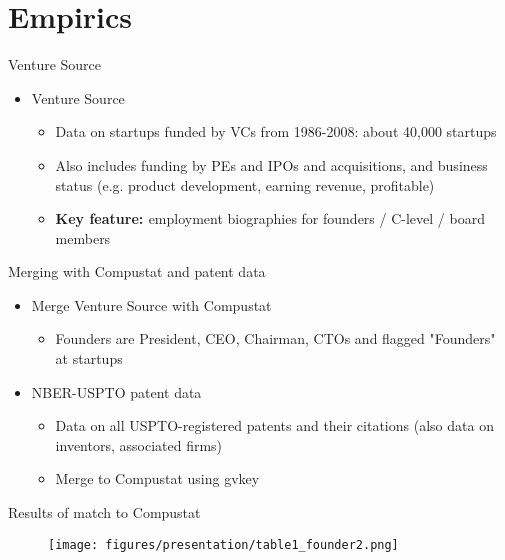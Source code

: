 \documentclass[english,usenames,dvipsnames]{beamer}
\begin{document}
\section{Empirics}

\begin{frame}
\tableofcontents[currentsection]
\end{frame}

\begin{frame}{Venture Source}
\begin{itemize}
	\item Venture Source
	\begin{itemize}
		\item Data on startups funded by VCs from 1986-2008: about 40,000 startups
		\item Also includes funding by PEs and IPOs and acquisitions, and business status (e.g. product development, earning revenue, profitable)
		\item \textbf{\alert{Key feature: }} employment biographies for founders / C-level / board members \\
	\end{itemize}
\end{itemize}
\end{frame}

\begin{frame}{Merging with Compustat and patent data}
\begin{itemize}
\item Merge Venture Source with Compustat
\begin{itemize}
	\item Founders are President, CEO, Chairman, CTOs and flagged "Founders" at startups
\end{itemize}
\item NBER-USPTO patent data
\begin{itemize}
	\item Data on all USPTO-registered patents and their citations (also data on inventors, associated firms)
	\item Merge to Compustat using gvkey
\end{itemize}
\end{itemize}
\end{frame}

\begin{frame}{Results of match to Compustat}
\begin{figure}
	\texttt{[image: figures/presentation/table1\_founder2.png]}
\end{figure}
\end{frame}
\end{document}
